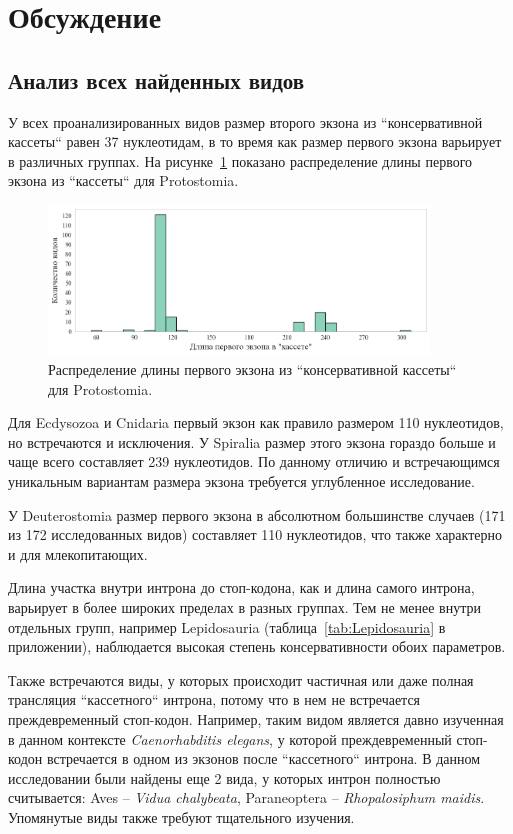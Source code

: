 \clearpage
\section{Обсуждение}

\subsection{Анализ всех найденных видов}

У всех проанализированных видов размер второго экзона из ``консервативной кассеты`` равен 37 нуклеотидам, в то время как размер первого экзона варьирует в различных группах.
На рисунке~\ref{fig:Protostomia_exon} показано распределение длины первого экзона из ``кассеты`` для Protostomia.

\begin{figure}[h] %
    \centering
    \includegraphics[width=0.9\textwidth]{images/Protostomia_exon}
    \caption{Распределение длины первого экзона из ``консервативной кассеты`` для Protostomia.}
    \label{fig:Protostomia_exon}
\end{figure}

Для Ecdysozoa и Cnidaria первый экзон как правило размером 110 нуклеотидов, но встречаются и исключения.
У Spiralia размер этого экзона гораздо больше и чаще всего составляет 239 нуклеотидов.
По данному отличию и встречающимся уникальным вариантам размера экзона требуется углубленное исследование.

У Deuterostomia размер первого экзона в абсолютном большинстве случаев (171 из 172 исследованных видов) составляет 110 нуклеотидов, что также характерно и для млекопитающих.

Длина участка внутри интрона до стоп-кодона, как и длина самого интрона, варьирует в более широких пределах в разных группах.
Тем не менее внутри отдельных групп, например Lepidosauria (таблица~\ref{tab:Lepidosauria} в приложении), наблюдается высокая степень консервативности обоих параметров.

Также встречаются виды, у которых происходит частичная или даже полная трансляция ``кассетного`` интрона, потому что в нем не встречается преждевременный стоп-кодон.
Например, таким видом является давно изученная в данном контексте \textit{Caenorhabditis elegans}, у которой преждевременный стоп-кодон встречается в одном из экзонов после ``кассетного`` интрона.
В данном исследовании были найдены еще 2 вида, у которых интрон полностью считывается: Aves – \textit{Vidua chalybeata}, Paraneoptera – \textit{Rhopalosiphum maidis}.
Упомянутые виды также требуют тщательного изучения.


